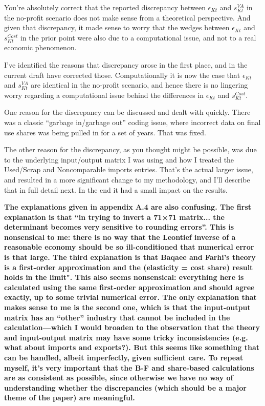 \documentclass[11pt]{article}
\begin{document}
You're absolutely correct that the reported discrepancy between $\epsilon_{Kt}$ and $s_{Kt}^{VA}$ in the no-profit scenario does not make sense from a theoretical perspective. And given that discrepancy, it made sense to worry that the wedges between $\epsilon_{Kt}$ and $s_{Kt}^{Cost}$ in the prior point were also due to a computational issue, and not to a real economic phenomenon.

I've identified the reasons that discrepancy arose in the first place, and in the current draft have corrected those. Computationally it is now the case that $\epsilon_{Kt}$ and $s_{Kt}^{VA}$ are identical in the no-profit scenario, and hence there is no lingering worry regarding a computational issue behind the differences in $\epsilon_{Kt}$ and $s_{Kt}^{Cost}$.

One reason for the discrepancy can be discussed and dealt with quickly. There was a classic ``garbage in/garbage out'' coding issue, where incorrect data on final use shares was being pulled in for a set of years. That was fixed.

The other reason for the discrepancy, as you thought might be possible, was due to the underlying input/output matrix I was using and how I treated the Used/Scrap and Noncomparable imports entries. That's the actual larger issue, and resulted in a more significant change to my methodology, and I'll describe that in full detail next. In the end it had a small impact on the results.

\textbf{The explanations given in appendix A.4 are also confusing. The first explanation is that “in trying to invert a 71×71 matrix... the determinant becomes very sensitive to rounding errors”. This is nonsensical to me: there is no way that the Leontief inverse of a reasonable economy should be so ill-conditioned that numerical error is that large. The third explanation is that Baqaee and Farhi’s theory is a first-order approximation and the (elasticity = cost share) result holds in the limit". This also seems nonsensical: everything here is calculated using the same first-order approximation and should agree exactly, up to some trivial numerical error. The only explanation that makes sense to me is the second one, which is that the input-output matrix has an “other” industry that cannot be included in the calculation—which I would broaden to the observation that the theory and input-output matrix may have some tricky inconsistencies (e.g. what about imports and exports?). But this seems like something that can be handled, albeit imperfectly, given sufficient care. To repeat myself, it’s very important that the B-F and share-based calculations are as consistent as possible, since otherwise we have no way of understanding whether the discrepancies (which should be a major theme of the paper) are meaningful.}
\end{document}
